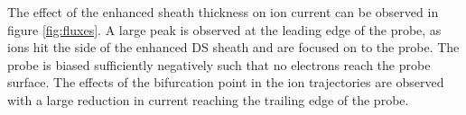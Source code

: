 The effect of the enhanced sheath thickness on ion current can be observed in figure \ref{fig:fluxes}. A large peak is observed at the leading edge of the probe, as ions hit the side of the enhanced DS sheath and are focused on to the probe. The probe is biased sufficiently negatively such that no electrons reach the probe surface. The effects of the bifurcation point in the ion trajectories are observed with a large reduction in current reaching the trailing edge of the probe.




